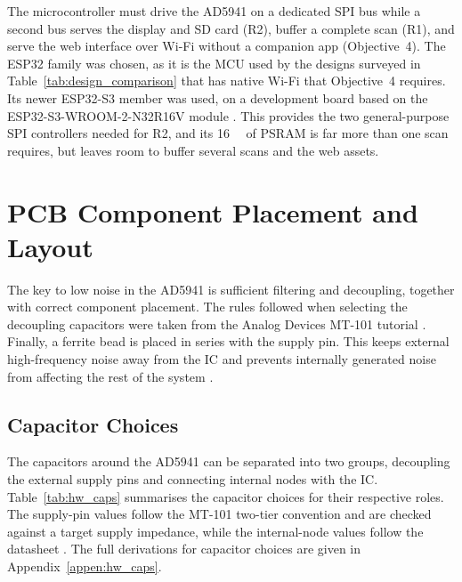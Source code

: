 The microcontroller must drive the AD5941 on a dedicated SPI bus while a second bus serves the display and SD card (R2), buffer a complete scan (R1), and serve the web interface over Wi-Fi without a companion app (Objective~4). The ESP32 family was chosen, as it is the MCU used by the  designs surveyed in Table~\ref{tab:design_comparison} that has native Wi-Fi that Objective~4 requires. Its newer ESP32-S3 member was used, on a development board based on the ESP32-S3-WROOM-2-N32R16V module \cite{esp32s3_wroom2_ds}. This provides the two general-purpose SPI controllers needed for R2, and its \SI{16}{\mega\byte} of PSRAM is far more than one scan requires, but leaves room to buffer several scans and the web assets.

\section{PCB Component Placement and Layout}
\label{sec:hw_afe}

The key to low noise in the AD5941 is sufficient filtering and decoupling,
together with correct component placement. The rules followed when selecting
the decoupling capacitors were taken from the Analog Devices MT-101 tutorial
\cite{adi_mt101}. Finally, a ferrite bead is placed in series with the
supply pin. This keeps external high-frequency noise away from the IC and
prevents internally generated noise from affecting the rest of the system \cite{eco2016ferrite}.

\providecommand{\capstack}[1]{\begin{tabular}[t]{@{}l@{}}#1\end{tabular}}
 
\subsection{Capacitor Choices}
\label{sec:hw_caps}
 
The capacitors around the AD5941 can be separated into two groups, decoupling the external supply pins and connecting internal nodes with the IC. Table~\ref{tab:hw_caps} summarises the capacitor choices for their respective roles. The supply-pin values follow the MT-101
two-tier convention \cite{adi_mt101} and are checked against a target supply
impedance, while the internal-node values follow the datasheet
\cite{ad5941_ds}. The full derivations for capacitor choices are given in
Appendix~\ref{appen:hw_caps}.
 
